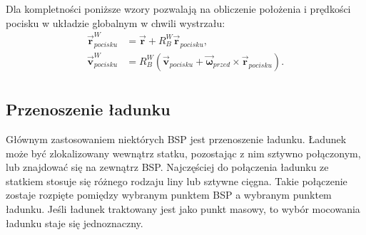 Dla kompletności poniższe wzory pozwalają na obliczenie położenia i prędkości pocisku w układzie globalnym w chwili wystrzału:
\[
	\begin{aligned}
	\vec{\bm{r}}_{pocisku}^W & = \vec{\bm{r}} + R_B^W \vec{\bm{r}}_{pocisku},\\
	\vec{\bm{v}}_{pocisku}^W & =  R_B^W \left( \vec{\bm{v}}_{pocisku} + \vec{\bm{\omega}}_{przed} \times \vec{\bm{r}}_{pocisku} \right).\\
	\end{aligned}
\]



\subsection{Przenoszenie ładunku}

Głównym zastosowaniem niektórych BSP jest przenoszenie ładunku. Ładunek może być zlokalizowany wewnątrz statku, pozostając z nim sztywno połączonym, lub znajdować się na zewnątrz BSP. Najczęściej do połączenia ładunku ze statkiem stosuje się różnego rodzaju liny lub sztywne cięgna. Takie połączenie zostaje rozpięte pomiędzy wybranym punktem BSP a wybranym punktem ładunku. Jeśli ładunek traktowany jest jako punkt masowy, to wybór mocowania ładunku staje się jednoznaczny.\\

